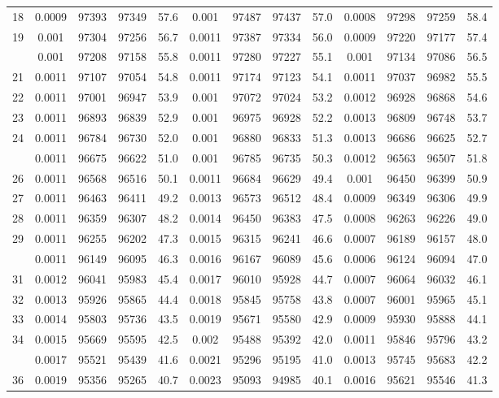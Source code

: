 \documentclass[
  14pt,
]{article}
\begin{document}
\begin{longtable}[t]{lcccccccccccc}
18 & 0.0009 & 97393 & 97349 & 57.6 & 0.001 & 97487 & 97437 & 57.0 & 0.0008 & 97298 & 97259 & 58.4\\
19 & 0.001 & 97304 & 97256 & 56.7 & 0.0011 & 97387 & 97334 & 56.0 & 0.0009 & 97220 & 97177 & 57.4\\
\addlinespace
20 & 0.001 & 97208 & 97158 & 55.8 & 0.0011 & 97280 & 97227 & 55.1 & 0.001 & 97134 & 97086 & 56.5\\
21 & 0.0011 & 97107 & 97054 & 54.8 & 0.0011 & 97174 & 97123 & 54.1 & 0.0011 & 97037 & 96982 & 55.5\\
22 & 0.0011 & 97001 & 96947 & 53.9 & 0.001 & 97072 & 97024 & 53.2 & 0.0012 & 96928 & 96868 & 54.6\\
23 & 0.0011 & 96893 & 96839 & 52.9 & 0.001 & 96975 & 96928 & 52.2 & 0.0013 & 96809 & 96748 & 53.7\\
24 & 0.0011 & 96784 & 96730 & 52.0 & 0.001 & 96880 & 96833 & 51.3 & 0.0013 & 96686 & 96625 & 52.7\\
\addlinespace
25 & 0.0011 & 96675 & 96622 & 51.0 & 0.001 & 96785 & 96735 & 50.3 & 0.0012 & 96563 & 96507 & 51.8\\
26 & 0.0011 & 96568 & 96516 & 50.1 & 0.0011 & 96684 & 96629 & 49.4 & 0.001 & 96450 & 96399 & 50.9\\
27 & 0.0011 & 96463 & 96411 & 49.2 & 0.0013 & 96573 & 96512 & 48.4 & 0.0009 & 96349 & 96306 & 49.9\\
28 & 0.0011 & 96359 & 96307 & 48.2 & 0.0014 & 96450 & 96383 & 47.5 & 0.0008 & 96263 & 96226 & 49.0\\
29 & 0.0011 & 96255 & 96202 & 47.3 & 0.0015 & 96315 & 96241 & 46.6 & 0.0007 & 96189 & 96157 & 48.0\\
\addlinespace
30 & 0.0011 & 96149 & 96095 & 46.3 & 0.0016 & 96167 & 96089 & 45.6 & 0.0006 & 96124 & 96094 & 47.0\\
31 & 0.0012 & 96041 & 95983 & 45.4 & 0.0017 & 96010 & 95928 & 44.7 & 0.0007 & 96064 & 96032 & 46.1\\
32 & 0.0013 & 95926 & 95865 & 44.4 & 0.0018 & 95845 & 95758 & 43.8 & 0.0007 & 96001 & 95965 & 45.1\\
33 & 0.0014 & 95803 & 95736 & 43.5 & 0.0019 & 95671 & 95580 & 42.9 & 0.0009 & 95930 & 95888 & 44.1\\
34 & 0.0015 & 95669 & 95595 & 42.5 & 0.002 & 95488 & 95392 & 42.0 & 0.0011 & 95846 & 95796 & 43.2\\
\addlinespace
35 & 0.0017 & 95521 & 95439 & 41.6 & 0.0021 & 95296 & 95195 & 41.0 & 0.0013 & 95745 & 95683 & 42.2\\
36 & 0.0019 & 95356 & 95265 & 40.7 & 0.0023 & 95093 & 94985 & 40.1 & 0.0016 & 95621 & 95546 & 41.3\\

\end{longtable}
\end{document}
